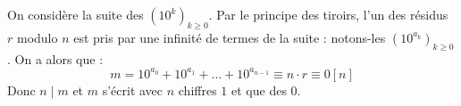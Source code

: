 \begin{sol}
On considère la suite des $(10^k)_{k\ge0}$. Par le principe des tiroirs, l'un des résidus $r$ modulo $n$ est pris par une infinité de termes de la suite : notons-les $(10^{a_k})_{k\ge0}$. On a alors que : $$m=10^{a_0}+10^{a_1}+\dots+10^{a_{n-1}}\equiv n\cdot r\equiv0[n]$$
Donc $n\mid m$ et $m$ s'écrit avec $n$ chiffres $1$ et que des $0$.
\end{sol}
